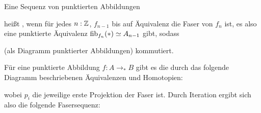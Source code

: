 \begin{definition}
  Eine Sequenz von punktierten Abbildungen
  \begin{center}
  \end{center}
  heißt , wenn für jedes \(n:\mathbb{Z}\), \(f_{n-1}\) bis auf Äquivalenz die Faser von \(f_n\) ist, es also eine punktierte Äquivalenz \(\mathrm{fib}_{f_n}(\ast)\simeq A_{n-1}\) gibt, sodass
  \begin{center}
  \end{center}
  (als Diagramm punktierter Abbildungen) kommutiert.
\end{definition}

\begin{lemma}
  \label{fasersequenz}
  Für eine punktierte Abbildung \(f:A\to_\ast B\) gibt es die durch das folgende Diagramm beschriebenen Äquivalenzen und Homotopien:
  \begin{center}
  \end{center}
  wobei \(p_i\) die jeweilige erste Projektion der Faser ist. Durch Iteration ergibt sich also die folgende Fasersequenz:
  \begin{center}
  \end{center}
\end{lemma}


